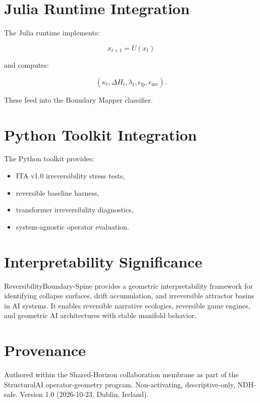 \documentclass[11pt]{article}
\begin{document}
\section{Julia Runtime Integration}

The Julia runtime implements:

\[
x_{t+1} = U(x_t)
\]

and computes:

\[
(\kappa_t, \Delta H_t, \lambda_t, \epsilon_{\text{fp}}, \epsilon_{\text{inv}}).
\]

These feed into the Boundary Mapper classifier.

\section{Python Toolkit Integration}

The Python toolkit provides:

\begin{itemize}
    \item ITA v1.0 irreversibility stress tests,
    \item reversible baseline harness,
    \item transformer irreversibility diagnostics,
    \item system-agnostic operator evaluation.
\end{itemize}

\section{Interpretability Significance}

ReversibilityBoundary-Spine provides a geometric interpretability framework
for identifying collapse surfaces, drift accumulation, and irreversible attractor
basins in AI systems. It enables reversible narrative ecologies, reversible game
engines, and geometric AI architectures with stable manifold behavior.

\section*{Provenance}

Authored within the Shared-Horizon collaboration membrane as part of the
StructuralAI operator-geometry program. Non-activating, descriptive-only,
NDH-safe. Version 1.0 (2026-10-23, Dublin, Ireland).
\end{document}
